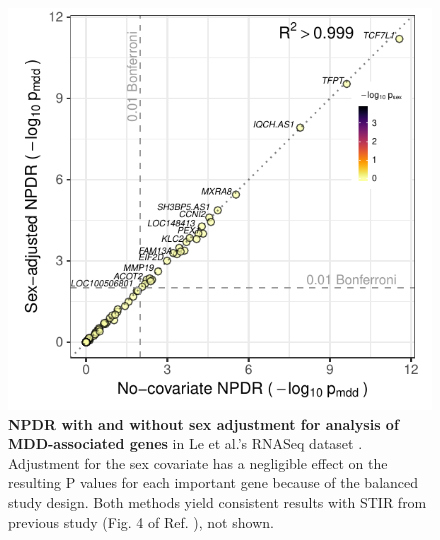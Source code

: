 \documentclass{article}
\begin{document}
\begin{figure}[h]%
\centerline{\includegraphics[]{../figs/jerzy_npdrs_mdd.pdf}}
\caption{\textbf{NPDR with and without sex adjustment for analysis of MDD-associated genes} in Le et al.'s RNASeq dataset \cite{le18}. Adjustment for the sex covariate has a negligible effect on the resulting P values for each important gene because of the balanced study design. Both methods yield consistent results with STIR from previous study (Fig. 4 of Ref. \cite{stir}), not shown.}
\label{fig:jerzy_npdrs_mdd}
\end{figure}

\clearpage

\end{document}
